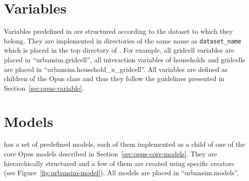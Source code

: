 \section{Variables}
\variablesindex
%
Variables \variablesindex predefined in  are structured according to the
dataset \datasetindex to which they belong. They are implemented in directories of the same
name as \verb|dataset_name| \datasetindex which is placed in the top directory of
. For example, all gridcell variables \variablesindex are placed in
``urbansim.gridcell'', all interaction variables \variablesindex of households and
gridcells are placed in ``urbansim.household_x_gridcell''. All variables \variablesindex
are defined as children of the Opus  class  \variablesindex and
thus they follow the guidelines presented in Section~\ref{sec:opus-variable}.

\section{Models}
\label{sec:urbansim-models}
\modelsindex

 has a set of predefined models, \modelsindex each
of them implemented as a child of one of the core Opus models
\modelsindex described in Section~\ref{sec:opus-core-models}.  They
are hierarchically structured and a few of them are created using
specific creators (see Figure~\ref{fig:urbansim-model}).  All
 models \modelsindex are placed in
``urbansim.models''.


